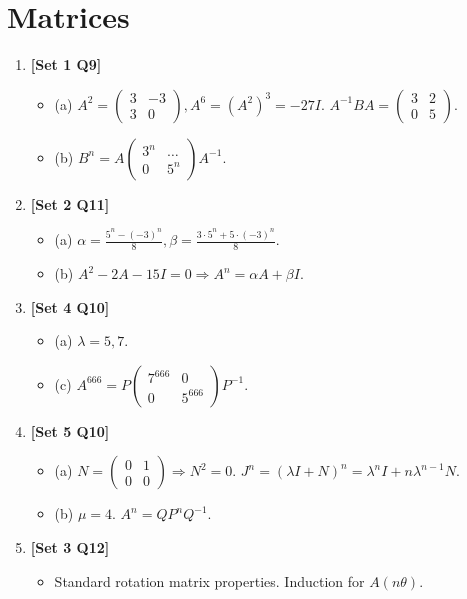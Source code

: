 \documentclass[12pt, a4paper]{article} %
\begin{document}
\section{Matrices}
\begin{enumerate}
    \item \textbf{[Set 1 Q9]}
    \begin{itemize}
        \item (a) $A^2 = \begin{pmatrix} 3 & -3 \\ 3 & 0 \end{pmatrix}, A^6 = (A^2)^3 = -27I$. $A^{-1}BA = \begin{pmatrix} 3 & 2 \\ 0 & 5 \end{pmatrix}$.
        \item (b) $B^n = A \begin{pmatrix} 3^n & \dots \\ 0 & 5^n \end{pmatrix} A^{-1}$.
    \end{itemize}

    \item \textbf{[Set 2 Q11]}
    \begin{itemize}
        \item (a) $\alpha = \frac{5^n - (-3)^n}{8}, \beta = \frac{3 \cdot 5^n + 5 \cdot (-3)^n}{8}$.
        \item (b) $A^2 - 2A - 15I = 0 \Rightarrow A^n = \alpha A + \beta I$.
    \end{itemize}

    \item \textbf{[Set 4 Q10]}
    \begin{itemize}
        \item (a) $\lambda = 5, 7$.
        \item (c) $A^{666} = P \begin{pmatrix} 7^{666} & 0 \\ 0 & 5^{666} \end{pmatrix} P^{-1}$.
    \end{itemize}

    \item \textbf{[Set 5 Q10]}
    \begin{itemize}
        \item (a) $N = \begin{pmatrix} 0 & 1 \\ 0 & 0 \end{pmatrix} \Rightarrow N^2 = 0$. $J^n = (\lambda I + N)^n = \lambda^n I + n\lambda^{n-1}N$.
        \item (b) $\mu = 4$. $A^n = Q P^n Q^{-1}$.
    \end{itemize}

    \item \textbf{[Set 3 Q12]}
    \begin{itemize}
        \item Standard rotation matrix properties. Induction for $A(n\theta)$.
    \end{itemize}
\end{enumerate}
\end{document}
